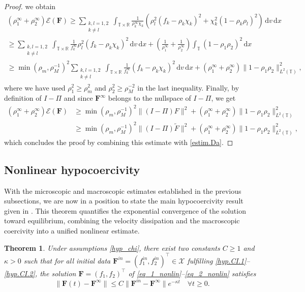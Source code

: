 \documentclass[reqno]{amsart}
\newtheorem{Theorem}{Theorem}
\newcommand{\dd}{\,\mathrm{d}}
\newcommand{\R}{\mathbb{R}}
\newcommand{\T}{\mathbb{T}}
\newcommand{\Ft}{{\widetilde{F}}}
\newcommand{\Fbf}{\mathbf{F}}
\numberwithin{equation}{section}
\begin{document}
\begin{proof}
we obtain
\begin{gather*}
(\rho_1^\infty+\rho_2^\infty)\mathcal{E}(\Fbf) \geq  \sum_{\substack{k,l=1,2\\ k\neq l}}\int_{\T\times\R}\frac{1}{\rho_k^\infty\chi_k}\left(\rho_l^2(f_k-\rho_k\chi_k)^2+\chi_k^2(1-\rho_k\rho_l)^2\right)\dd v\dd x\\
\geq  \sum_{\substack{k,l=1,2\\ k\neq l}}\int_{\T\times\R}\frac{1}{f_k^\infty}\rho_l^2(f_k-\rho_k\chi_k)^2\dd v\dd x+\left(\frac{1}{\rho_1^\infty}+\frac{1}{\rho_2^\infty}\right)\int_\T (1-\rho_1\rho_2)^2\dd x \\
\geq \min(\rho_m,\rho_M^{-1})^2 \sum_{\substack{k,l=1,2\\ k\neq l}}\int_{\T\times\R}\frac{1}{f_k^\infty}(f_k-\rho_k\chi_k)^2\dd v\dd x+(\rho_1^\infty+\rho_2^\infty)\|1-\rho_1\rho_2\|_{L^2(\T)}^2,
\end{gather*}
where we have used $\rho_1^2\geq \rho_m^2$ and $\rho_2^2\geq \rho_M^{-2}$ in the last inequality. Finally, by definition of $I-\Pi$ and since $\Fbf^\infty$ belongs to the nullspace of $I-\Pi$, we get
\begin{align*}
(\rho_1^\infty+\rho_2^\infty)\mathcal{E}(\Fbf) &\geq \min(\rho_m,\rho_M^{-1})^2\|(I-\Pi)F\|^2+(\rho_1^\infty+\rho_2^\infty)\|1-\rho_1\rho_2\|_{L^2(\T)}^2\\
&\geq \min(\rho_m,\rho_M^{-1})^2\|(I-\Pi)\Ft\|^2+(\rho_1^\infty+\rho_2^\infty)\|1-\rho_1\rho_2\|_{L^2(\T)}^2,
\end{align*}
which concludes the proof by combining this estimate with \eqref{estim.Da}.
\end{proof}

\subsection{Nonlinear hypocoercivity}
With the microscopic and macroscopic estimates established in the previous subsections, we are now in a position to state the main hypocoercivity result given in \cite{FavrePirnerSchmeiser2023}. This theorem quantifies the exponential convergence of the solution toward equilibrium, combining the velocity dissipation and the macroscopic coercivity into a unified nonlinear estimate.
\begin{Theorem}\label{thm.hypoco}
    Under assumptions \eqref{hyp_chi}, there exist two constants $C\geq 1$ and $\kappa>0$ such that for all initial data $\Fbf^{in}=(f_1^{in},f_2^{in})^\top \in \mathcal{X}$ fulfilling \eqref{hyp.CI.1}--\eqref{hyp.CI.2}, the solution $\Fbf=(f_1,f_2)^\top$ of \eqref{eq_1_nonlin}--\eqref{eq_2_nonlin} satisfies
    \begin{equation}\label{estim.hypoco}
        \|\Fbf(t)-\Fbf^\infty\|\leq C\|\Fbf^{in}-\Fbf^\infty\|e^{-\kappa t}\quad \forall t\geq 0.
    \end{equation}
\end{Theorem}
\end{document}
